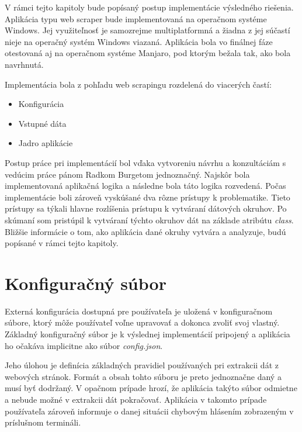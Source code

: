 V rámci tejto kapitoly bude popísaný postup implementácie výsledného riešenia. Aplikácia typu web scraper bude implementovaná na operačnom systéme Windows. Jej využiteľnosť je samozrejme multiplatformná a žiadna z jej súčastí nieje na operačný systém Windows viazaná. Aplikácia bola vo finálnej fáze otestovaná aj na operačnom systéme Manjaro, pod ktorým bežala tak, ako bola navrhnutá.

Implementácia bola z pohľadu web scrapingu rozdelená do viacerých častí:

\begin{itemize}
    \item {Konfigurácia}
    \item {Vstupné dáta}
    \item {Jadro aplikácie}
\end{itemize}

\bigskip

Postup práce pri implementácií bol vďaka vytvoreniu návrhu a konzultáciám s vedúcim práce pánom Radkom Burgetom jednoznačný. Najskôr bola implementovaná aplikačná logika a následne bola táto logika rozvedená. Počas implementácie boli zároveň vyskúšané dva rôzne prístupy k problematike. Tieto prístupy sa týkali hlavne rozlíšenia prístupu k vytváraní dátových okruhov. Po skúmaní som pristúpil k vytváraní týchto okruhov dát na základe atribútu \textit{class}. Bližšie informácie o tom, ako aplikácia dané okruhy vytvára a analyzuje, budú popísané v rámci tejto kapitoly.

\section{Konfiguračný súbor}

Externá konfigurácia dostupná pre používateľa je uložená v konfiguračnom súbore, ktorý môže používateľ voľne upravovať a dokonca zvoliť svoj vlastný. Základný konfiguračný súbor je k výslednej implementácií pripojený a aplikácia ho očakáva implicitne ako súbor \textit{config.json}.

Jeho úlohou je definícia základných pravidiel používaných pri extrakcii dát z webových stránok. Formát a obsah tohto súboru je preto jednoznačne daný a musí byť dodržaný. V opačnom prípade hrozí, že aplikácia takýto súbor odmietne a nebude možné v extrakcii dát pokračovať. Aplikácia v takomto prípade používateľa zároveň informuje o danej situácii chybovým hlásením zobrazeným v príslušnom termináli. 
\newpage

